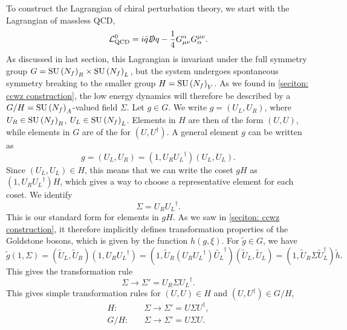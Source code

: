 To construct the Lagrangian of chiral perturbation theory, we start with the Lagrangian of massless QCD,
%
\begin{equation}
    \mathcal{L}^0_\text{QCD} = i \bar q \slashed D q - \frac{1}{4} G^\alpha_{\mu \nu} G_\alpha^{\mu \nu}.
\end{equation}
%
As discussed in last section, this Lagrangian is invariant under the full symmetry group $G = \text{SU}\left(N_f\right)_R \times \text{SU}\left(N_f\right)_L$, but the system undergoes spontaneous symmetry breaking to the smaller group $H = \text{SU}\left(N_f\right)_V$.
As we found in \autoref{seciton: ccwz construction}, the low energy dynamics will therefore be described by a $G/H = \text{SU}\left(N_f\right)_A$-valued field $\Sigma$.
Let $g \in G$.
We write $g = (U_L, U_R)$, where $U_R \in \text{SU}\left(N_f\right)_R$, $U_L \in \text{SU}\left(N_f\right)_L$.
Elements in $H$ are then of the form $(U, U)$, while elements in $G$ are of the for $(U, U^\dagger)$.
A general element $g$ can be written as
%
\begin{equation}
    g = (U_L, U_R) = (1, U_R {U_L}^\dagger) (U_L, U_L).
\end{equation}
%
Since $(U_L, U_L) \in H$, this means that we can write the coset $g H$ as $(1, U_R {U_L}^\dagger)H$, which gives a way to choose a representative element for each coset.
We identify
%
\begin{equation}
    \Sigma = U_R {U_L}^\dagger. 
\end{equation}
%
This is our standard form for elements in $gH$.
As we saw in \autoref{seciton: ccwz construction}, it therefore implicitly defines transformation properties of the Goldstone bosons, which is given by the function $h(g, \xi)$.
For $\tilde g \in G$, we have
%
\begin{equation}
    \tilde g (1, \Sigma)
    = (\tilde U_L, \tilde U_R) (1, U_R {U_L}^\dagger)
    = (1, \tilde U_R (U_R {U_L}^\dagger) \tilde {U_L}^\dagger) (\tilde U_L, \tilde U_L)
    = (1, \tilde U_R \Sigma \tilde U_L^\dagger) \tilde h.
\end{equation}
%
This gives the transformation rule
\begin{equation}
    \Sigma \rightarrow \Sigma' = U_R \Sigma {U_L}^\dagger.
\end{equation}
%
This gives simple transformation rules for $(U, U) \in H$ and $(U, U^\dagger) \in G/H$,
\begin{align}
    \label{sigma transform under H}
    H:& \quad \Sigma \rightarrow \Sigma' = U \Sigma U^\dagger, \\
    \label{sigma transform under G/H}
    G/H:& \quad \Sigma \rightarrow \Sigma' = U \Sigma U.
\end{align}

